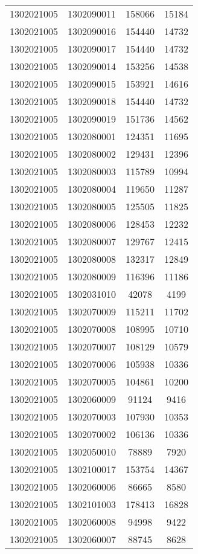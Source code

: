 \begin{longtable}[h]{llcc}
		1302021005 & 1302090011 & 158066 & 15184\\
		1302021005 & 1302090016 & 154440 & 14732\\
		1302021005 & 1302090017 & 154440 & 14732\\
		1302021005 & 1302090014 & 153256 & 14538\\
		1302021005 & 1302090015 & 153921 & 14616\\
		1302021005 & 1302090018 & 154440 & 14732\\
		1302021005 & 1302090019 & 151736 & 14562\\
		1302021005 & 1302080001 & 124351 & 11695\\
		1302021005 & 1302080002 & 129431 & 12396\\
		1302021005 & 1302080003 & 115789 & 10994\\
		1302021005 & 1302080004 & 119650 & 11287\\
		1302021005 & 1302080005 & 125505 & 11825\\
		1302021005 & 1302080006 & 128453 & 12232\\
		1302021005 & 1302080007 & 129767 & 12415\\
		1302021005 & 1302080008 & 132317 & 12849\\
		1302021005 & 1302080009 & 116396 & 11186\\
		1302021005 & 1302031010 & 42078 & 4199\\
		1302021005 & 1302070009 & 115211 & 11702\\
		1302021005 & 1302070008 & 108995 & 10710\\
		1302021005 & 1302070007 & 108129 & 10579\\
		1302021005 & 1302070006 & 105938 & 10336\\
		1302021005 & 1302070005 & 104861 & 10200\\
		1302021005 & 1302060009 & 91124 & 9416\\
		1302021005 & 1302070003 & 107930 & 10353\\
		1302021005 & 1302070002 & 106136 & 10336\\
		1302021005 & 1302050010 & 78889 & 7920\\
		1302021005 & 1302100017 & 153754 & 14367\\
		1302021005 & 1302060006 & 86665 & 8580\\
		1302021005 & 1302101003 & 178413 & 16828\\
		1302021005 & 1302060008 & 94998 & 9422\\
		1302021005 & 1302060007 & 88745 & 8628\\

\end{longtable}
